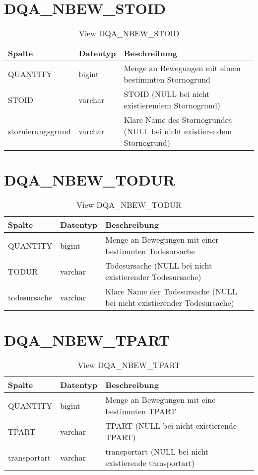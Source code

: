   \section{DQA\_NBEW\_STOID}

  \begin{table}[ht]
    \centering
    \caption{View DQA\_NBEW\_STOID}
    \label{tab:dqanbewstoid}
    \begin{tabular}{||l|l|p{10cm}||}
      \hline
      Spalte & Datentyp & Beschreibung \\ [0.5ex] \hline \hline
QUANTITY & bigint & Menge an Bewegungen mit einem bestimmten Stornogrund \\ \hline
STOID & varchar & STOID (NULL bei nicht existierendem Stornogrund)\\ \hline
stornierungsgrund & varchar & Klare Name des Stornogrundes (NULL bei nicht existierendem Stornogrund)\\ \hline
    \end{tabular}
  \end{table}

  \section{DQA\_NBEW\_TODUR}

  \begin{table}[ht]
    \centering
    \caption{View DQA\_NBEW\_TODUR}
    \label{tab:dqanbewtodur}
    \begin{tabular}{||l|l|p{10cm}||}
      \hline
      Spalte & Datentyp & Beschreibung \\ [0.5ex] \hline \hline
QUANTITY & bigint & Menge an Bewegungen mit einer bestimmten Todesursache \\ \hline
TODUR & varchar & Todesursache (NULL bei nicht existierender Todesursache)\\ \hline
todesursache & varchar & Klare Name der Todesursache (NULL bei nicht existierender Todesursache)\\ \hline
    \end{tabular}
  \end{table}
 \clearpage
  \section{DQA\_NBEW\_TPART}

  \begin{table}[ht]
    \centering
    \caption{View DQA\_NBEW\_TPART}
    \label{tab:dqanbewtpart}
    \begin{tabular}{||l|l|p{10cm}||}
      \hline
      Spalte & Datentyp & Beschreibung \\ [0.5ex] \hline \hline
QUANTITY & bigint & Menge an Bewegungen mit eine bestimmten TPART \\ \hline
TPART & varchar & TPART (NULL bei nicht existierende TPART)\\ \hline
transportart & varchar & transportart (NULL bei nicht existierende transportart)\\ \hline
    \end{tabular}
  \end{table}

